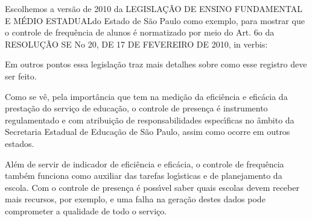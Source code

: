 \documentclass[
12pt,		%
openright,	%
twoside,  %
a4paper,			%
chapter=TITLE,		%
english,			%
french,				%
spanish,			%
brazil				%
]{USPSC-classe/USPSC}
\begin{document}
Escolhemos a vers\~ao de 2010 da \textquotedbl LEGISLA\c{C}\~AO DE ENSINO FUNDAMENTAL E M\'EDIO ESTADUAL\textquotedbl  do Estado de S\~ao Paulo como exemplo, para mostrar que o controle de frequ\^encia de alunos \'e normatizado por meio do Art. 6o da RESOLU\c{C}\~AO SE No 20, DE 17 DE FEVEREIRO DE 2010, in verbis:


















\noindent\begin{center}\mbox{\centering{}}\end{center}


Em outros pontos essa legisla\c{c}\~ao traz mais detalhes sobre como esse registro deve ser feito.

















Como se v\^e, pela import\^ancia que tem na medi\c{c}\~ao da efici\^encia e efic\'acia da presta\c{c}\~ao do servi\c{c}o de educa\c{c}\~ao, o controle de presen\c{c}a \'e instrumento regulamentado e com atribui\c{c}\~ao de responsabilidades espec\'{\i}ficas no \^ambito da Secretaria Estadual de Educa\c{c}\~ao de S\~ao Paulo, assim como ocorre em outros estados.

















Al\'em de servir de indicador de efici\^encia e efic\'acia, o controle de frequ\^encia tamb\'em funciona como auxiliar das tarefas log\'{\i}sticas e de planejamento da escola. Com o controle de presen\c{c}a \'e poss\'{\i}vel saber quais escolas devem receber mais recursos, por exemplo, e uma falha na gera\c{c}\~ao destes dados pode comprometer a qualidade de todo o servi\c{c}o.
\end{document}
